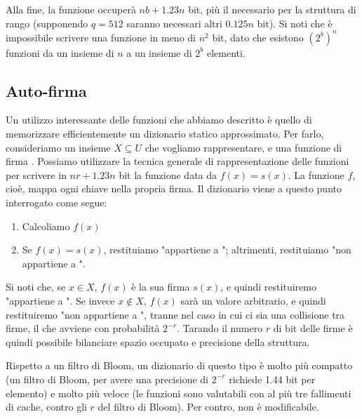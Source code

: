Alla fine, la funzione occuperà $nb + 1.23n$ bit, più il necessario per la struttura di rango (supponendo $q = 512$ saranno necessari altri $0.125n$ bit). Si noti che è impossibile scrivere una funzione in meno di $n^2$ bit, dato che esistono $(2^b)^n$ funzioni da un insieme di $n$ a un insieme di $2^b$ elementi.
\subsection{Auto-firma}
Un utilizzo interessante delle funzioni che abbiamo descritto è quello di memorizzare efficientemente un dizionario statico approssimato. Per farlo, consideriamo un insieme $X \subseteq U$ che vogliamo rappresentare, e una funzione di firma .
Possiamo utilizzare la tecnica generale di rappresentazione delle funzioni per scrivere in $nr + 1.23n$ bit la funzione  data da $f(x) = s(x)$. La funzione $f$, cioè, mappa ogni chiave nella propria firma. Il dizionario viene a questo punto interrogato come segue:
\begin{enumerate}
    \item Calcoliamo $f(x)$
    \item Se $f(x) = s(x)$, restituiamo "appartiene a "; altrimenti, restituiamo "non appartiene a ".
\end{enumerate}
Si noti che, se $x \in X$, $f(x)$ è la sua firma $s(x)$, e quindi restituiremo "appartiene a ". Se invece $x \notin X$, $f(x)$ sarà un valore arbitrario, e quindi restituiremo "non appartiene a ", tranne nel caso in cui ci sia una collisione tra firme, il che avviene con probabilità $2^{-r}$. Tarando il numero $r$ di bit delle firme è quindi possibile bilanciare spazio occupato e precisione della struttura.

Rispetto a un filtro di Bloom, un dizionario di questo tipo è molto più compatto (un filtro di Bloom, per avere una precisione di $2^{-r}$ richiede 1.44 bit per elemento) e molto più veloce (le funzioni sono valutabili con al più tre fallimenti di cache, contro gli $r$ del filtro di Bloom). Per contro, non è modificabile.
